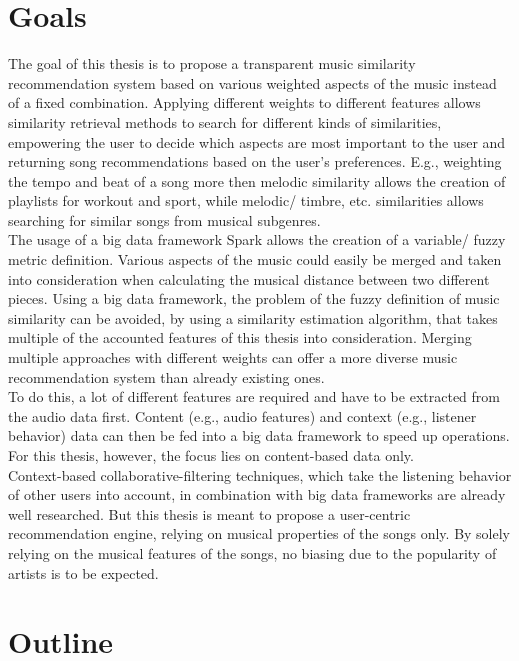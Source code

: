 \section{Goals}

The goal of this thesis is to propose a transparent music similarity recommendation system based on various weighted aspects of the music instead of a fixed combination. Applying different weights to different features allows similarity retrieval methods to search for different kinds of similarities, empowering the user to decide which aspects are most important to the user and returning song recommendations based on the user's preferences. E.g., weighting the tempo and beat of a song more then melodic similarity allows the creation of playlists for workout and sport, while melodic/ timbre, etc. similarities allows searching for similar songs from musical subgenres.\\ 
The usage of a big data framework Spark allows the creation of a variable/ fuzzy metric definition. Various aspects of the music could easily be merged and taken into consideration when calculating the musical distance between two different pieces. Using a big data framework, the problem of the fuzzy definition of music similarity can be avoided, by using a similarity estimation algorithm, that takes multiple of the accounted features of this thesis into consideration. Merging multiple approaches with different weights can offer a more diverse music recommendation system than already existing ones.\\ 
To do this, a lot of different features are required and have to be extracted from the audio data first. Content (e.g., audio features) and context (e.g., listener behavior) data can then be fed into a big data framework to speed up operations. For this thesis, however, the focus lies on content-based data only.\\ 
Context-based collaborative-filtering techniques, which take the listening behavior of other users into account, in combination with big data frameworks are already well researched. But this thesis is meant to propose a user-centric recommendation engine, relying on musical properties of the songs only. By solely relying on the musical features of the songs, no biasing due to the popularity of artists is to be expected.\\

\section{Outline}

